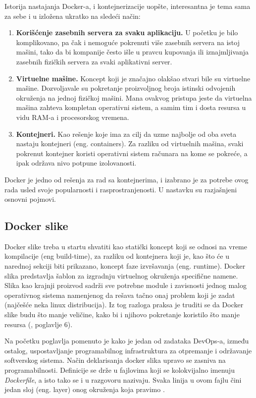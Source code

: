 \documentclass[12pt,oneside]{memoir}
\begin{document}
Istorija nastajanja Docker-a, i kontejnerizacije uopšte, interesantna je tema sama za sebe i u \cite{dockerdeepdive} izložena ukratko na sledeći način:
\begin{enumerate}
    \item \textbf{Korišćenje zasebnih servera za svaku aplikaciju.} U početku je bilo komplikovano, pa čak i nemoguće pokrenuti više zasebnih servera na istoj mašini, tako da bi kompanije često išle u pravcu kupovanja ili iznajmljivanja zasebnih fizičkih servera za svaki aplikativni server.
    \item \textbf{Virtuelne mašine.} Koncept koji je značajno olakšao stvari bile su virtuelne mašine. Dozvoljavale su pokretanje proizvoljnog broja istinski odvojenih okruženja na jednoj fizičkoj mašini. Mana ovakvog pristupa jeste da virtuelna mašina zahteva kompletan operativni sistem, a samim tim i dosta resursa u vidu RAM-a i procesorskog vremena.
    \item \textbf{Kontejneri.} Kao rešenje koje ima za cilj da uzme najbolje od oba sveta nastaju kontejneri (eng. containers). Za razliku od virtuelnih mašina, svaki pokrenut kontejner koristi operativni sistem računara na kome se pokreće, a ipak održava nivo potpune izolovanosti.
\end{enumerate}

Docker je jedno od rešenja za rad sa kontejnerima, i izabrano je za potrebe ovog rada usled svoje popularnosti i rasprostranjenosti. U nastavku su razjašnjeni osnovni pojmovi.

\subsection{Docker slike}

Docker slike treba u startu shvatiti kao statički koncept koji se odnosi na vreme kompilacije (eng build-time), za razliku od kontejnera koji je, kao što će u narednoj sekciji biti prikazano, koncept faze izvršavanja (eng. runtime). Docker slika predstavlja šablon za izgradnju virtuelnog okruženja specifične namene. Slika kao krajnji proizvod sadrži sve potrebne module i zavisnosti jednog malog operativnog sistema namenjenog da rešava tačno onaj problem koji je zadat (najčešće neka linux distribucija). Iz tog razloga praksa je truditi se da Docker slike budu što manje veličine, kako bi i njihovo pokretanje koristilo što manje resursa (\cite{dockerdeepdive}, poglavlje 6).

Na početku poglavlja pomenuto je kako je jedan od zadataka DevOps-a, između ostalog, uspostavljanje programabilnog infrastruktura za otpremanje i održavanje softverskog sistema. Način deklarisanja docker slika upravo se zasniva na programabilnosti. Definicije se drže u fajlovima koji se kolokvijalno imenuju \textit{Dockerfile}, a isto tako se i u razgovoru nazivaju. Svaka linija u ovom fajlu čini jedan sloj (eng. layer) onog okruženja koja pravimo \cite{dockerdeepdive}.
\end{document}
